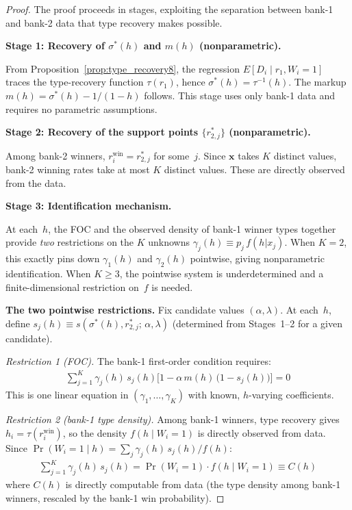 \documentclass[12pt]{article}
\theoremstyle{plain}
\theoremstyle{plain}
\theoremstyle{definition}
\theoremstyle{remark}
\begin{document}
\begin{proof}
The proof proceeds in stages, exploiting the separation between bank-1 and bank-2 data that type recovery makes possible.

\medskip\noindent
\textbf{Stage 1: Recovery of $\sigma^*(h)$ and $m(h)$ (nonparametric).}

From Proposition~\ref{prop:type_recovery8}, the regression $E[D_i \mid r_1, W_i = 1]$ traces the type-recovery function $\tau(r_1)$, hence $\sigma^*(h) = \tau^{-1}(h)$.  The markup $m(h) = \sigma^*(h) - 1/(1-h)$ follows.  This stage uses only bank-1 data and requires no parametric assumptions.

\medskip\noindent
\textbf{Stage 2: Recovery of the support points $\{r_{2,j}^*\}$ (nonparametric).}

Among bank-2 winners, $r_i^{\text{win}} = r_{2,j}^*$ for some~$j$.  Since $\mathbf{x}$ takes $K$ distinct values, bank-2 winning rates take at most $K$ distinct values.  These are directly observed from the data.

\medskip\noindent
\textbf{Stage 3: Identification mechanism.}

At each~$h$, the FOC and the observed density of bank-1 winner types together provide \emph{two} restrictions on the $K$ unknowns $\gamma_j(h) \equiv p_j\, f(h|x_j)$.  When $K = 2$, this exactly pins down $\gamma_1(h)$ and $\gamma_2(h)$ pointwise, giving nonparametric identification.  When $K \geq 3$, the pointwise system is underdetermined and a finite-dimensional restriction on~$f$ is needed.

\medskip\noindent
\textbf{The two pointwise restrictions.}  Fix candidate values $(\alpha, \lambda)$.  At each~$h$, define $s_j(h) \equiv s(\sigma^*(h), r_{2,j}^*;\, \alpha, \lambda)$ (determined from Stages~1--2 for a given candidate).

\medskip\noindent
\emph{Restriction 1 (FOC).}  The bank-1 first-order condition requires:
\begin{align}\tag{R1}
    \sum_{j=1}^K \gamma_j(h)\, s_j(h)\Big[1 - \alpha\, m(h)\,\big(1\!-\!s_j(h)\big)\Big] = 0
\end{align}
This is one linear equation in $(\gamma_1, \ldots, \gamma_K)$ with known, $h$-varying coefficients.

\medskip\noindent
\emph{Restriction 2 (bank-1 type density).}  Among bank-1 winners, type recovery gives $h_i = \tau(r_i^{\text{win}})$, so the density $f(h \mid W_i = 1)$ is directly observed from data.  Since $\Pr(W_i = 1 \mid h) = \sum_j \gamma_j(h)\, s_j(h) / f(h)$:
\begin{align}\tag{R2}
    \sum_{j=1}^K \gamma_j(h)\, s_j(h) = \Pr(W_i = 1) \cdot f(h \mid W_i = 1) \equiv C(h)
\end{align}
where $C(h)$ is directly computable from data (the type density among bank-1 winners, rescaled by the bank-1 win probability).


\end{proof}
\end{document}

